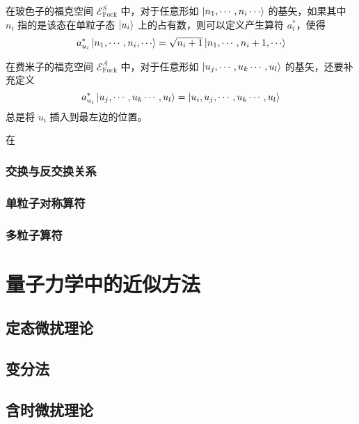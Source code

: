 \documentclass[cn,10pt,math=newtx,citestyle=gb7714-2015,bibstyle=gb7714-2015]{elegantbook}
\def\ms{\mathscr}
\begin{document}
\begin{definition}[产生算符]
    在玻色子的福克空间 $\ms E_\text{Fock}^S$ 中，对于任意形如 $\ket{n_1,\cdots,n_i\cdots}$ 的基矢，如果其中 $n_i$ 指的是该态在单粒子态 $\ket{u_i}$ 上的占有数，则可以定义产生算符 $a_i^*$，使得
    \begin{equation}
        a_{u_i}^*\ket{n_1,\cdots,n_i,\cdots} = \sqrt{n_i+1}\ket{n_1,\cdots,n_i+1,\cdots}
    \end{equation}
    
    在费米子的福克空间 $\ms E_\text{Fock}^A$ 中，对于任意形如 $\ket{u_j,\cdots,u_k\cdots,u_l}$ 的基矢，还要补充定义
    \begin{equation}
        a_{u_i}^*\ket{u_j,\cdots,u_k\cdots,u_l} = \ket{u_i,u_j,\cdots,u_k\cdots,u_l}
    \end{equation}
    总是将 $u_i$ 插入到最左边的位置。
\end{definition}

在

\subsubsection{交换与反交换关系}

\subsubsection{单粒子对称算符}

\subsubsection{多粒子算符}

\section{量子力学中的近似方法}

\subsection{定态微扰理论}

\subsection{变分法}

\subsection{含时微扰理论}
\end{document}
